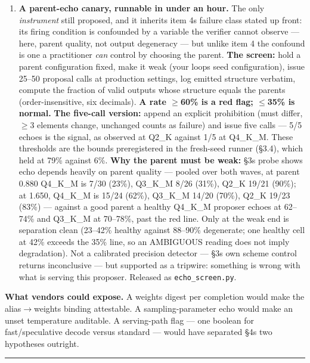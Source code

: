 \begin{enumerate}
\item
  \textbf{A parent-echo canary, runnable in under an hour.} The only \emph{instrument} still proposed, and it inherits item 4\textquotesingle s failure class stated up front: its firing condition is confounded by a variable the verifier cannot observe --- here, parent quality, not output degeneracy --- but unlike item 4 the confound is one a practitioner \emph{can} control by choosing the parent. \textbf{The screen:} hold a parent configuration fixed, make it weak (your loop\textquotesingle s seed configuration), issue 25--50 proposal calls at production settings, log emitted structure verbatim, compute the fraction of valid outputs whose structure equals the parent\textquotesingle s (order-insensitive, six decimals). \textbf{A rate \(\geq\)60\% is a red flag; \(\leq\)35\% is normal.} \textbf{The five-call version:} append an explicit prohibition (must differ, \(\geq\)3 elements change, unchanged counts as failure) and issue five calls --- 5/5 echoes is the signal, as observed at Q2\_K against 1/5 at Q4\_K\_M. These thresholds are the bounds preregistered in the fresh-seed runner (§3.4), which held at 79\% against 6\%. \textbf{Why the parent must be weak:} §3\textquotesingle s probe shows echo depends heavily on parent quality --- pooled over both waves, at parent 0.880 Q4\_K\_M is 7/30 (23\%), Q3\_K\_M 8/26 (31\%), Q2\_K 19/21 (90\%); at 1.650, Q4\_K\_M is 15/24 (62\%), Q3\_K\_M 14/20 (70\%), Q2\_K 19/23 (83\%) --- against a good parent a healthy Q4\_K\_M proposer echoes at 62--74\% and Q3\_K\_M at 70--78\%, past the red line. Only at the weak end is separation clean (23--42\% healthy against 88--90\% degenerate; one healthy cell at 42\% exceeds the 35\% line, so an AMBIGUOUS reading does not imply degradation). Not a calibrated precision detector --- §3\textquotesingle s own scheme control returns inconclusive --- but supported as a tripwire: something is wrong with what is serving this proposer. Released as \texttt{echo\_screen.py}.
\end{enumerate}

\textbf{What vendors could expose.} A weights digest per completion would make the alias\(\rightarrow\)weights binding attestable. A sampling-parameter echo would make an unset temperature auditable. A serving-path flag --- one boolean for fast/speculative decode versus standard --- would have separated §4\textquotesingle s two hypotheses outright.

\begin{center}\rule{0.5\linewidth}{0.5pt}\end{center}

